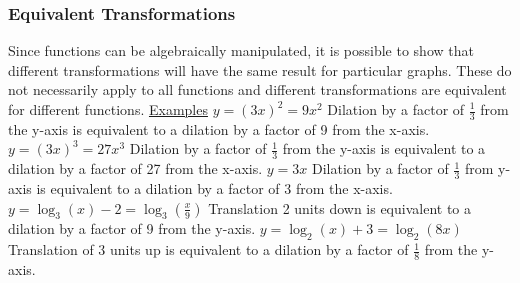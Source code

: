 \documentclass{article}
\begin{document}
			\subsubsection{Equivalent Transformations}
				Since functions can be algebraically manipulated, it is possible to show that different transformations will have the same result for particular graphs. These do not necessarily apply to all functions and different transformations are equivalent for different functions.
				\newline\newline
				\underline{Examples}\newline
				$y=(3x)^2=9x^2$\newline
				Dilation by a factor of $\frac{1}{3}$ from the y-axis is equivalent to a dilation by a factor of 9 from the x-axis.\newline\newline
				$y=(3x)^3=27x^3$\newline
				Dilation by a factor of $\frac{1}{3}$ from the y-axis is equivalent to a dilation by a factor of 27 from the x-axis.\newline\newline
				$y=3x$\newline
				Dilation by a factor of $\frac{1}{3}$ from y-axis is equivalent to a dilation by a factor of 3 from the x-axis.\newline\newline
				$y=\log_3(x)-2=\log_3(\frac{x}{9})$\newline
				Translation 2 units down is equivalent to a dilation by a factor of 9 from the y-axis.\newline\newline
				$y=\log_2(x)+3=\log_2(8x)$\newline
				Translation of 3 units up is equivalent to a dilation by a factor of $\frac{1}{8}$ from the y-axis.\newpage
\end{document}
